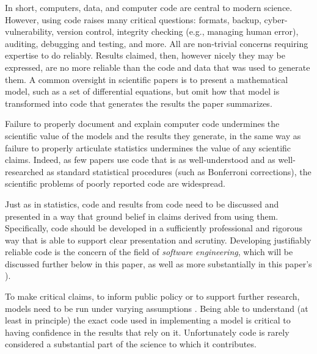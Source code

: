 In short, computers, data, and computer code are central to modern science. However, using code raises many critical questions: formats, backup, cyber-vulnerability, version control, integrity checking (e.g., managing human error), auditing, debugging and testing, and more. All are non-trivial concerns requiring expertise to do reliably. Results claimed, then, however nicely they may be expressed, are no more reliable than the code and data that was used to generate them. A common oversight in scientific papers is to present a mathematical model, such as a set of differential equations, but omit how that model is transformed into code that generates the results the paper summarizes.

Failure to properly document and explain computer code undermines the scientific value of the models and the results they generate, in the same way as failure to properly articulate statistics undermines the value of any scientific claims. Indeed, as few papers use code that is as well-understood and as well-researched as standard statistical procedures (such as Bonferroni corrections), the scientific problems of poorly reported code are widespread. 


Just as in statistics, code and results from code need to be discussed and presented in a way that ground belief in claims derived from using them. Specifically, code should be developed in a sufficiently professional and rigorous way that is able to support clear presentation and scrutiny. Developing justifiably reliable code is the concern of the field of \emph{software engineering}, which will be discussed further below in this paper, as well as more substantially in this paper's \supplement). 

To make critical claims, to inform public policy or to support further research, models need to be run under varying assumptions \cite{whitty}. Being able to understand (at least in principle) the exact code used in implementing a model is critical to having confidence in the results that rely on it. Unfortunately code is rarely considered a substantial part of the science to which it contributes. 


